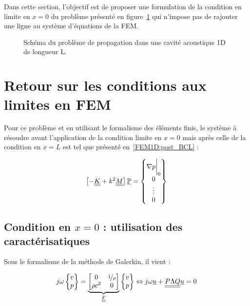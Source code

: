Dans cette section, l'objectif est de proposer une formulation de la condition en limite en $x=0$ du problème présenté
en figure~\ref{fig:rflx:propa_1D} qui n'impose pas de rajouter une ligne au système d'équations de la FEM.

\begin{figure}[!ht]
	\centering
	
	\caption{\label{fig:rflx:propa_1D}Schéma du problème de propagation dans une cavité acoustique 1D de longueur L.}
\end{figure}

\section{Retour sur les conditions aux limites en FEM}

Pour ce problème et en utilisant le formalisme des éléments finis, le système à résoudre avant l'application de la
condition limite en $x=0$ mais après celle de la condition en $x=L$ est tel que présenté en~\eqref{FEM1D:post_BCL} :

\begin{equation}
\left[- \underline{\underline{K}} + k^2\underline{\underline{M}}\right]\underline{\mathbb{P}} = \begin{Bmatrix} \nabla p\bigg|_0\\0\\\vdots\\0\end{Bmatrix} \label{rflx:FEM}
\end{equation}


\subsection{Condition en $x=0$ : utilisation des caractérisatiques}

Sous le formalisme de la méthode de Galerkin, il vient :

\begin{equation}
	j\omega\begin{Bmatrix}v\\p\end{Bmatrix} = 
		\underbrace{\begin{bmatrix}0 & \nicefrac{1}{\rho}\\\rho c^2 & 0\end{bmatrix}}_{\underline{\underline{F}}}
		\begin{Bmatrix}v\\p\end{Bmatrix} \Leftrightarrow j\omega\underline{u} + \underline{\underline{P\Lambda Q}}\underline{u} = 0
		\label{rflx:begin_dgm}
\end{equation}

